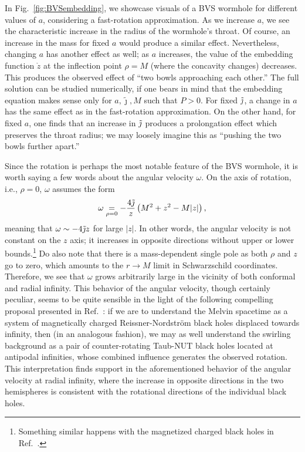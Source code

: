 \documentclass[aps,preprint,groupedaddress,nofootinbib,superscriptaddress,showkeys,showpacs,eqsecnum,amsmath,amssymb]{revtex4-1}
\begin{document}
In Fig.~\ref{fig:BVSembedding}, we showcase visuals of a BVS wormhole for different values of $a$, considering a fast-rotation approximation. As we increase $a$, we see the characteristic increase in the radius of the wormhole's throat. Of course, an increase in the mass for fixed $a$ would produce a similar effect. Nevertheless, changing $a$ has another effect as well; as $a$ increases, the value of the embedding function $\mathring{z}$ at the inflection point $\rho=M$ (where the concavity changes) decreases. This produces the observed effect of ``two bowls approaching each other.'' The full solution can be studied numerically, if one bears in mind that the embedding equation makes sense only for $a,\tilde{\jmath},M$ such that $P>0$. For fixed $\Tilde{\jmath}$, a change in $a$ has the same effect as in the fast-rotation approximation. On the other hand, for fixed $a$, one finds that an increase in $\Tilde{\jmath}$ produces a prolongation effect which preserves the throat radius; we may loosely imagine this as ``pushing the two bowls further apart.''

Since the rotation is perhaps the most notable feature of the BVS wormhole, it is worth saying a few words about the angular velocity $\omega$. On the axis of rotation, i.e., $\rho=0$, $\omega$ assumes the form
\begin{equation}
    \omega \underset{\rho=0}{=}-\frac{4\Tilde{\jmath}}{z}\left( M^2 + z^2 - M|z|\right),
\end{equation}
meaning that $\omega\sim -4\Tilde{\jmath}z$ for large $|z|$. In other words, the angular velocity is not constant on the $z$ axis; it increases in opposite directions without upper or lower bounds.\footnote{Something similar happens with the magnetized charged black holes in Ref.~\cite{Gibbons:2013yq}.} Do also note that there is a mass-dependent single pole as both $\rho$ and $z$ go to zero, which amounts to the $r\to M$ limit in Schwarzschild coordinates. Therefore, we see that $\omega$ grows arbitrarily large in the vicinity of both conformal and radial infinity. This behavior of the angular velocity, though certainly peculiar, seems to be quite sensible in the light of the following compelling proposal presented in Ref.~\cite{Astorino:2022aam}: if we are to understand the Melvin spacetime as a system of magnetically charged Reissner-Nordström black holes displaced towards infinity, then (in an analogous fashion), we may as well understand the swirling background as a pair of counter-rotating Taub-NUT black holes located at antipodal infinities, whose combined influence generates the observed rotation. This interpretation finds support in the aforementioned behavior of the angular velocity at radial infinity, where the increase in opposite directions in the two hemispheres is consistent with the rotational directions of the individual black holes. 
\end{document}
